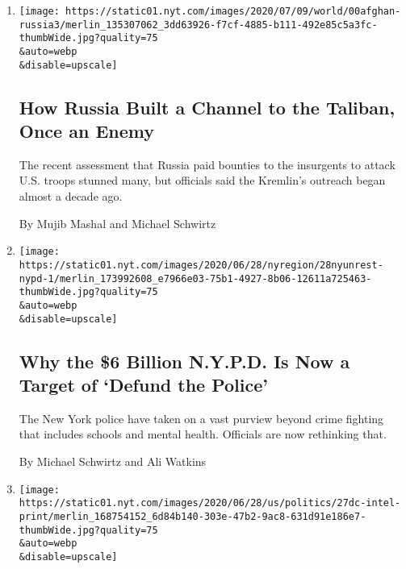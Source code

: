 \begin{enumerate}
\def\labelenumi{\arabic{enumi}.}
\item
  \href{/2020/07/13/world/asia/russia-taliban-afghanistan.html}{}

  \texttt{[image: https://static01.nyt.com/images/2020/07/09/world/00afghan-russia3/merlin\_135307062\_3dd63926-f7cf-4885-b111-492e85c5a3fc-thumbWide.jpg?quality=75\\\&auto=webp\\\&disable=upscale]}

  \hypertarget{how-russia-built-a-channel-to-the-taliban-once-an-enemy}{%
  \subsection{How Russia Built a Channel to the Taliban, Once an
  Enemy}\label{how-russia-built-a-channel-to-the-taliban-once-an-enemy}}

  The recent assessment that Russia paid bounties to the insurgents to
  attack U.S. troops stunned many, but officials said the Kremlin's
  outreach began almost a decade ago.

  By Mujib Mashal and Michael Schwirtz
\item
  \href{/2020/06/28/nyregion/nypd-budget-defund-police.html}{}

  \texttt{[image: https://static01.nyt.com/images/2020/06/28/nyregion/28nyunrest-nypd-1/merlin\_173992608\_e7966e03-75b1-4927-8b06-12611a725463-thumbWide.jpg?quality=75\\\&auto=webp\\\&disable=upscale]}

  \hypertarget{why-the-6-billion-nypd-is-now-a-target-of-defund-the-police}{%
  \subsection{Why the \$6 Billion N.Y.P.D. Is Now a Target of `Defund
  the
  Police'}\label{why-the-6-billion-nypd-is-now-a-target-of-defund-the-police}}

  The New York police have taken on a vast purview beyond crime fighting
  that includes schools and mental health. Officials are now rethinking
  that.

  By Michael Schwirtz and Ali Watkins
\item
  \href{/2020/06/27/us/politics/trump-russia-bounties-afghanistan.html}{}

  \texttt{[image: https://static01.nyt.com/images/2020/06/28/us/politics/27dc-intel-print/merlin\_168754152\_6d84b140-303e-47b2-9ac8-631d91e186e7-thumbWide.jpg?quality=75\\\&auto=webp\\\&disable=upscale]}


\end{enumerate}
